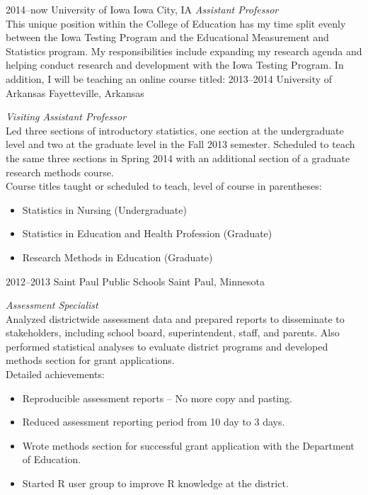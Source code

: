 \documentclass[]{friggeri-cv} %
\begin{document}
\begin{entrylist}
\entry
{2014--now}
{University of Iowa}
{Iowa City, IA}
{\emph{Assistant Professor} \\
This unique position within the College of Education has my time split evenly between the Iowa Testing Program and the Educational Measurement and Statistics program.  My responsibilities include expanding my research agenda and helping conduct research and development with the Iowa Testing Program.  In addition, I will be teaching an online course titled: \textit{}}
\entry
{2013--2014}
{University of Arkansas}
{Fayetteville, Arkansas}
{\emph{Visiting Assistant Professor} \\
Led three sections of introductory statistics, one section at the undergraduate level and two at the graduate level in the Fall 2013 semester.  Scheduled to teach the same three sections in Spring 2014 with an additional section of a graduate research methods course. \\
Course titles taught or scheduled to teach, level of course in parentheses:
\begin{itemize}
\item Statistics in Nursing (Undergraduate)
\item Statistics in Education and Health Profession (Graduate)
\item Research Methods in Education (Graduate)
\end{itemize}}
\entry
{2012--2013}
{Saint Paul Public Schools}
{Saint Paul, Minnesota}
{\emph{Assessment Specialist} \\
Analyzed districtwide assessment data and prepared reports to disseminate to stakeholders, including school board, superintendent, staff, and parents. Also performed statistical analyses to evaluate district programs and developed methods section for grant applications. \\
Detailed achievements:
\begin{itemize}
\item Reproducible assessment reports -- No more copy and pasting.
\item Reduced assessment reporting period from 10 day to 3 days.
\item Wrote methods section for successful grant application with the Department of Education.
\item Started R user group to improve R knowledge at the district.
\end{itemize}}

\end{entrylist}
\end{document}
